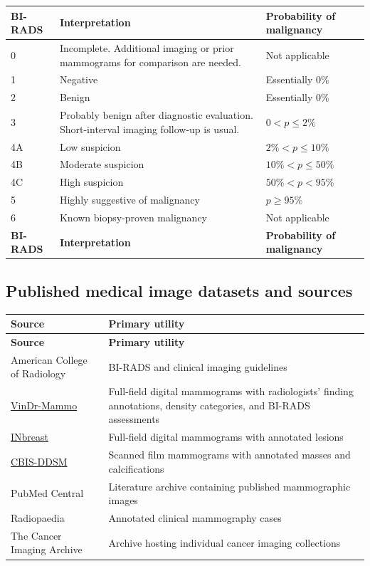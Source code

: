 \begin{longtable}{@{}p{}p{}p{}@{}}
\toprule
\textbf{BI-RADS} & \textbf{Interpretation} & \textbf{Probability of malignancy} \\
\midrule
\endfirsthead
\toprule
0 & Incomplete. Additional imaging or prior mammograms for comparison are needed. & Not applicable \\
\midrule
\endhead
1 & Negative & Essentially 0\% \\
2 & Benign & Essentially 0\% \\
3 & Probably benign after diagnostic evaluation. Short-interval imaging follow-up is usual. & $0 < p \leq 2\%$ \\
4A & Low suspicion & $2\% < p \leq 10\%$ \\
4B & Moderate suspicion & $10\% < p \leq 50\%$ \\
4C & High suspicion & $50\% < p < 95\%$ \\
5 & Highly suggestive of malignancy & $p \geq 95\%$ \\
6 & Known biopsy-proven malignancy & Not applicable \\
\textbf{BI-RADS} & \textbf{Interpretation} & \textbf{Probability of malignancy} \\
\bottomrule
\end{longtable}

\subsection{Published medical image datasets and sources}
\begin{longtable}{@{}p{}p{}@{}}
\toprule
\textbf{Source} & \textbf{Primary utility} \\
\midrule
\endfirsthead
\toprule
\textbf{Source} & \textbf{Primary utility} \\
\midrule
\endhead
American College of Radiology & BI-RADS and clinical imaging guidelines \\
\href{https://physionet.org/content/vindr-mammo/1.0.0/}{VinDr-Mammo} & Full-field digital mammograms with radiologists’ finding annotations, density categories, and BI-RADS assessments \\
\href{https://pubmed.ncbi.nlm.nih.gov/22078258/}{INbreast} & Full-field digital mammograms with annotated lesions \\
\href{https://wiki.cancerimagingarchive.net/pages/viewpage.action?pageId=52764371}{CBIS-DDSM} & Scanned film mammograms with annotated masses and calcifications \\
PubMed Central & Literature archive containing published mammographic images \\
Radiopaedia & Annotated clinical mammography cases \\
The Cancer Imaging Archive & Archive hosting individual cancer imaging collections \\
\bottomrule
\end{longtable}

